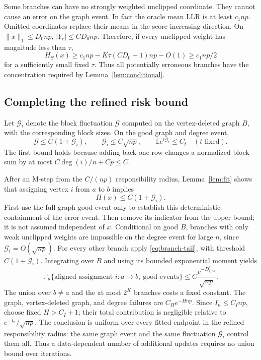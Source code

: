 \documentclass[11pt]{article}
\theoremstyle{definition}
\theoremstyle{remark}
\newcommand{\E}{\mathbb E}
\newcommand{\PP}{\mathbb P}
\numberwithin{equation}{section}
\begin{document}
Some branches can have no strongly weighted unclipped coordinate. They cannot cause an error on the graph event. In fact the oracle mean LLR is at least $c_1np$. Omitted coordinates replace their means in the score-increasing direction. On $\|x\|_1\le D_0np$, $|Y_c|\le C D_0np$. Therefore, if every unclipped weight has magnitude less than $\tau$,
\[
 H_S(x)\ge c_1np-K\tau(CD_0+1)np-O(1)\ge c_1np/2
\]
for a sufficiently small fixed $\tau$. Thus all potentially erroneous branches have the concentration required by Lemma~\ref{lem:conditional}.

\subsection{Completing the refined risk bound}
Let $\mathcal G_i$ denote the block fluctuation $\mathcal G$ computed on the vertex-deleted graph $B$, with the corresponding block sizes. On the good graph and degree event,
\[
 \mathcal G\le C(1+\mathcal G_i),\qquad \mathcal G_i\le C\sqrt{np},
 \qquad \E e^{t\mathcal G_i}\le C_t\quad(t\text{ fixed}).
\]
The first bound holds because adding back one row changes a normalized block sum by at most $C\deg(i)/n+Cp\le C$.

After an M-step from the $C/(np)$ responsibility radius, Lemma~\ref{lem:fit} shows that assigning vertex $i$ from $a$ to $b$ implies
\[
 H(x)\le C(1+\mathcal G_i).
\]
First use the full-graph good event only to establish this deterministic containment of the error event. Then remove its indicator from the upper bound; it is not assumed independent of $x$. Conditional on good $B$, branches with only weak unclipped weights are impossible on the degree event for large $n$, since $\mathcal G_i=O(\sqrt{np})$. For every other branch apply \eqref{eq:branch-tail}, with threshold $C(1+\mathcal G_i)$. Integrating over $B$ and using its bounded exponential moment yields
\[
 \PP_a\{\text{aligned assignment }i:a\to b,\ \text{good events}\}
 \le C\frac{e^{-D^*_{i,ab}}}{\sqrt{np}}.
\]
The union over $b\ne a$ and the at most $2^K$ branches costs a fixed constant. The graph, vertex-deleted graph, and degree failures are $C_H e^{-Hnp}$. Since $I_n\le C_I np$, choose fixed $H>C_I+1$; their total contribution is negligible relative to $e^{-I_n}/\sqrt{np}$. The conclusion is uniform over every fitted endpoint in the refined responsibility radius: the same graph event and the same fluctuation $\mathcal G_i$ control them all. Thus a data-dependent number of additional updates requires no union bound over iterations.
\end{document}
